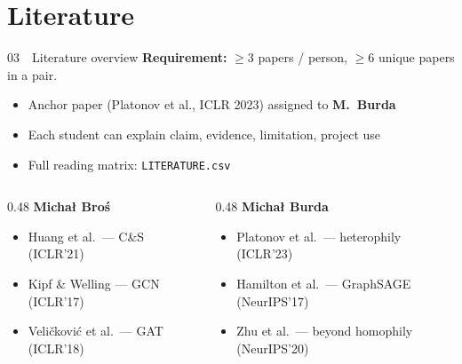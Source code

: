 \documentclass[
  english,
  aspectratio=169,
]{beamer}
\begin{document}
\section{Literature}

\begin{frame}{03~~Literature overview}
  \textbf{Requirement:} $\geq$3 papers / person, $\geq$6 unique papers in a pair.

  \vspace{0.5em}
  \begin{itemize}
    \item Anchor paper (Platonov et al., ICLR 2023) assigned to \textbf{M.~Burda}
    \item Each student can explain claim, evidence, limitation, project use
    \item Full reading matrix: \texttt{LITERATURE.csv}
  \end{itemize}

  \vspace{0.6em}
  \begin{columns}[T]
    \begin{column}{0.48\textwidth}
      \textbf{Micha\l{} Bro\'{s}}
      \begin{itemize}
        \item Huang et al.\ --- C\&S (ICLR'21)
        \item Kipf \& Welling --- GCN (ICLR'17)
        \item Veli\v{c}kovi\'{c} et al.\ --- GAT (ICLR'18)
      \end{itemize}
    \end{column}
    \begin{column}{0.48\textwidth}
      \textbf{Micha\l{} Burda}
      \begin{itemize}
        \item Platonov et al.\ --- heterophily (ICLR'23)
        \item Hamilton et al.\ --- GraphSAGE (NeurIPS'17)
        \item Zhu et al.\ --- beyond homophily (NeurIPS'20)
      \end{itemize}
    \end{column}
  \end{columns}
\end{frame}
\end{document}
